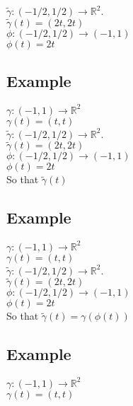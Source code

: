 \documentclass[twocolumn,20pt,fleqn]{extarticle}
\theoremstyle{plain}
\theoremstyle{definition}
\theoremstyle{remark}
\begin{document}
  $\tilde{\gamma} : (-1/2, 1/2) \to \mathbb{R}^2$.\\
  $\tilde{\gamma}(t) = (2t,2t)$\\

  $\phi: (-1/2,1/2) \to (-1,1)$\\
  $\phi(t) = 2t$\\


\clearpage



\subsection{Example}
  $\gamma : (-1, 1) \to \mathbb{R}^2$\\
  $\gamma(t) = (t,t)$\\

  $\tilde{\gamma} : (-1/2, 1/2) \to \mathbb{R}^2$.\\
  $\tilde{\gamma}(t) = (2t,2t)$\\

  $\phi: (-1/2,1/2) \to (-1,1)$\\
  $\phi(t) = 2t$\\
  So that $\tilde{\gamma}(t)$


\clearpage



\subsection{Example}
  $\gamma : (-1, 1) \to \mathbb{R}^2$\\
  $\gamma(t) = (t,t)$\\

  $\tilde{\gamma} : (-1/2, 1/2) \to \mathbb{R}^2$.\\
  $\tilde{\gamma}(t) = (2t,2t)$\\

  $\phi: (-1/2,1/2) \to (-1,1)$\\
  $\phi(t) = 2t$\\
  So that $\tilde{\gamma}(t) = \gamma(\phi(t))$


\clearpage



\subsection{Example}
  $\gamma : (-1, 1) \to \mathbb{R}^2$\\
  $\gamma(t) = (t,t)$\\
\end{document}
